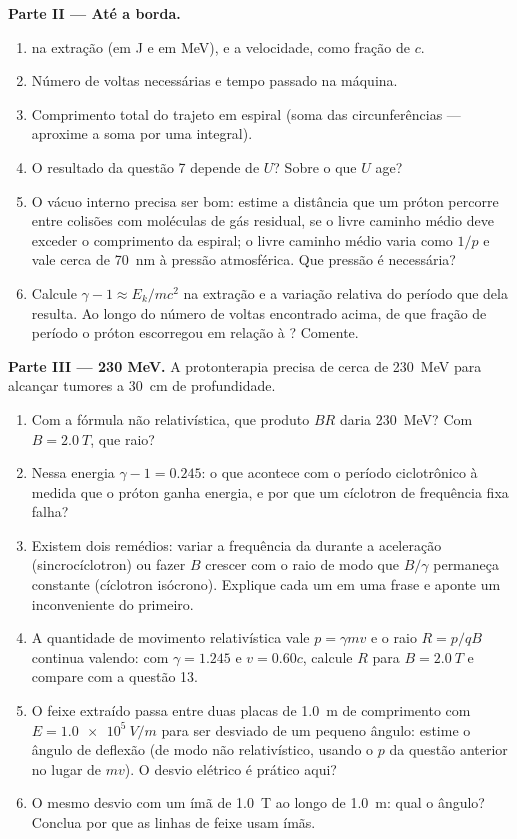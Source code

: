 \begin{problem}
\medskip
\noindent\textbf{Parte II --- Até a borda.}
\begin{enumerate}[resume]
  \item {} na extração (em J e em MeV), e a velocidade, como
        fração de $c$.
  \item Número de voltas necessárias e tempo passado na máquina.
  \item Comprimento total do trajeto em espiral (soma das circunferências ---
        aproxime a soma por uma integral).
  \item O resultado da questão 7 depende de $U$? Sobre o que $U$
        age?
  \item O vácuo interno precisa ser bom: estime a distância que um próton
        percorre entre colisões com moléculas de gás residual, se o
        livre caminho médio deve exceder o comprimento da espiral; o livre caminho médio
        varia como $1/p$ e vale cerca de \qty{70}{nm} à pressão
        atmosférica. Que pressão é necessária?
  \item Calcule $\gamma - 1 \approx E_k/mc^2$ na extração e a
        variação relativa do período que dela resulta. Ao longo do número de
        voltas encontrado acima, de que fração de período o próton
        escorregou em relação à ? Comente.
\end{enumerate}

\medskip
\noindent\textbf{Parte III --- 230 MeV.}
A protonterapia precisa de cerca de \qty{230}{MeV} para alcançar tumores a \qty{30}{cm}
de profundidade.
\begin{enumerate}[resume]
  \item Com a fórmula não relativística, que produto $BR$ daria
        \qty{230}{MeV}? Com $B = \qty{2.0}{T}$, que raio?
  \item Nessa energia $\gamma - 1 = 0.245$: o que acontece com o
        período ciclotrônico à medida que o próton ganha energia, e por que um
        cíclotron de frequência fixa falha?
  \item Existem dois remédios: variar a frequência da  durante a
        aceleração (sincrocíclotron) ou fazer $B$ crescer com o raio de modo
        que $B/\gamma$ permaneça constante (cíclotron isócrono). Explique
        cada um em uma frase e aponte um inconveniente do primeiro.
  \item A quantidade de movimento relativística vale $p = \gamma mv$ e o raio $R =
        p/qB$ continua valendo: com $\gamma = 1.245$ e $v = 0.60c$, calcule
        $R$ para $B = \qty{2.0}{T}$ e compare com a questão 13.
  \item O feixe extraído passa entre duas placas de \qty{1.0}{m} de comprimento
        com $E = \qty{1.0e5}{V/m}$ para ser desviado de um pequeno ângulo:
        estime o ângulo de deflexão (de modo não relativístico, usando o $p$
        da questão anterior no lugar de $mv$). O desvio elétrico é prático aqui?
  \item O mesmo desvio com um ímã de \qty{1.0}{T} ao longo de \qty{1.0}{m}:
        qual o ângulo? Conclua por que as linhas de feixe usam ímãs.
\end{enumerate}


\end{problem}
